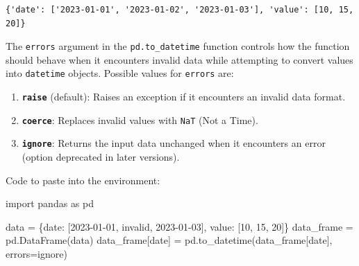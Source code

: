 \documentclass[
  english,
  letterpaper,
  DIV=11,
  numbers=noendperiod]{scrreprt}
\newenvironment{Shaded}{\begin{snugshade}}{\end{snugshade}}
\newcommand{\DecValTok}[1]{\textcolor[rgb]{0.68,0.00,0.00}{#1}}
\newcommand{\ImportTok}[1]{\textcolor[rgb]{0.00,0.46,0.62}{#1}}
\newcommand{\NormalTok}[1]{\textcolor[rgb]{0.00,0.23,0.31}{#1}}
\newcommand{\OperatorTok}[1]{\textcolor[rgb]{0.37,0.37,0.37}{#1}}
\newcommand{\StringTok}[1]{\textcolor[rgb]{0.13,0.47,0.30}{#1}}
\providecommand{\tightlist}{%
  \setlength{\itemsep}{0pt}\setlength{\parskip}{0pt}}
\begin{document}
\begin{verbatim}
{'date': ['2023-01-01', '2023-01-02', '2023-01-03'], 'value': [10, 15, 20]}
\end{verbatim}

The \texttt{errors} argument in the \texttt{pd.to\_datetime} function
controls how the function should behave when it encounters invalid data
while attempting to convert values into \texttt{datetime} objects.
Possible values for \texttt{errors} are:

\begin{enumerate}
\def\labelenumi{\arabic{enumi}.}
\tightlist
\item
  \textbf{\texttt{\textquotesingle{}raise\textquotesingle{}}} (default):
  Raises an exception if it encounters an invalid data format.
\item
  \textbf{\texttt{\textquotesingle{}coerce\textquotesingle{}}}: Replaces
  invalid values with \texttt{NaT} (Not a Time).
\item
  \textbf{\texttt{\textquotesingle{}ignore\textquotesingle{}}}: Returns
  the input data unchanged when it encounters an error (option
  deprecated in later versions).
\end{enumerate}

Code to paste into the environment:

\begin{Shaded}
\begin{Highlighting}[]
\ImportTok{import}\NormalTok{ pandas }\ImportTok{as}\NormalTok{ pd}

\NormalTok{data }\OperatorTok{=}\NormalTok{ \{}\StringTok{\textquotesingle{}date\textquotesingle{}}\NormalTok{: [}\StringTok{\textquotesingle{}2023{-}01{-}01\textquotesingle{}}\NormalTok{, }\StringTok{\textquotesingle{}invalid\textquotesingle{}}\NormalTok{, }\StringTok{\textquotesingle{}2023{-}01{-}03\textquotesingle{}}\NormalTok{], }\StringTok{\textquotesingle{}value\textquotesingle{}}\NormalTok{: [}\DecValTok{10}\NormalTok{, }\DecValTok{15}\NormalTok{, }\DecValTok{20}\NormalTok{]\}}
\NormalTok{data\_frame }\OperatorTok{=}\NormalTok{ pd.DataFrame(data)}
\NormalTok{data\_frame[}\StringTok{\textquotesingle{}date\textquotesingle{}}\NormalTok{] }\OperatorTok{=}\NormalTok{ pd.to\_datetime(data\_frame[}\StringTok{\textquotesingle{}date\textquotesingle{}}\NormalTok{], errors}\OperatorTok{=}\StringTok{\textquotesingle{}ignore\textquotesingle{}}\NormalTok{)}
\end{Highlighting}
\end{Shaded}
\end{document}
